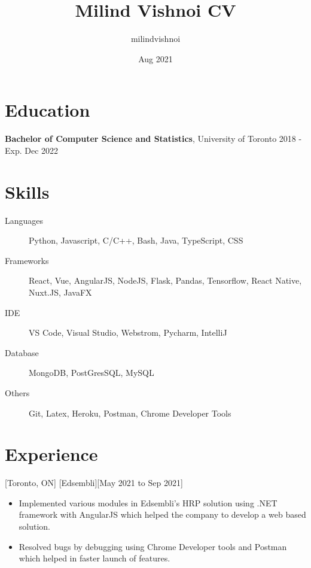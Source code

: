 \documentclass{article}
\title{Milind Vishnoi CV}
\author{milindvishnoi}
\date{Aug 2021}
\begin{document}

\makecvtitle %
 
 
 
\section{Education}
{\bf Bachelor of Computer Science and Statistics}, University of Toronto \hfill {2018 - Exp. Dec 2022}



\section{Skills}
\begin{description}
\item [Languages] Python, Javascript, C/C++, Bash, Java, TypeScript, CSS
\item [Frameworks] React, Vue, AngularJS, NodeJS, Flask, Pandas, Tensorflow, React Native, Nuxt.JS, JavaFX
\item [IDE] VS Code, Visual Studio, Webstrom, Pycharm, IntelliJ
\item [Database] MongoDB, PostGresSQL, MySQL
\item [Others] Git, Latex, Heroku, Postman, Chrome Developer Tools
\end{description}

 
 
\section{Experience}

[Toronto, ON]
[Edsembli][May 2021 to Sep 2021]
 \begin{itemize}
     \item Implemented various modules in Edsembli’s HRP solution using .NET framework with AngularJS which helped the company to develop a web based solution.
     \item Resolved bugs by debugging using Chrome Developer tools and Postman which helped in faster launch of features.
 \end{itemize}
\end{document}
